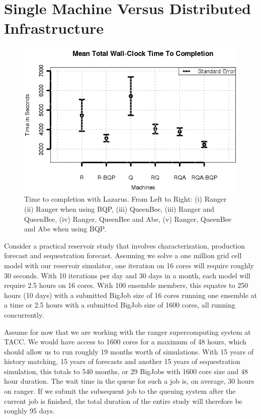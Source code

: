 \documentclass{rspublic}
\begin{document}
\section{Single Machine Versus Distributed Infrastructure}
\begin{figure}
\begin{center}
\includegraphics*[scale=0.5,angle=0]{figures/Figure7.png}
\end{center}
\caption{Time to completion with Lazarus. From Left to Right: (i)
  Ranger (ii) Ranger when using BQP, (iii) QueenBee, (iii) Ranger
  and QueenBee, (iv) Ranger, QueenBee and Abe, (v) Ranger, QueenBee 
  and Abe when using BQP.}
\label{fig:SingleVsDistributed}
\end{figure}

Consider a practical reservoir study that involves characterization, production forecast and sequestration forecast. Assuming we solve a one million grid cell model with our reservoir simulator, one iteration on 16 cores will require roughly 30 seconds. With 10 iterations per day and 30 days in a month, each model will require 2.5 hours on 16 cores. With 100 ensemble members, this equates to 250 hours (10 days) with a submitted BigJob size of 16 cores running one ensemble at a time or 2.5 hours with a submitted BigJob size of 1600 cores, all running concurrently.

Assume for now that we are working with the ranger supercomputing system at TACC. We would have access to 1600 cores for a maximum of 48 hours, which should allow us to run roughly 19 months worth of simulations. With 15 years of history matching, 15 years of forecasts and another 15 years of sequestration simulation, this totals to 540 months, or 29 BigJobs with 1600 core size and 48 hour duration. The wait time in the queue for such a job is, on average, 30 hours on ranger. If we submit the subsequent job to the queuing system after the current job is finished, the total duration of the entire study will therefore be roughly 95 days.
\end{document}
